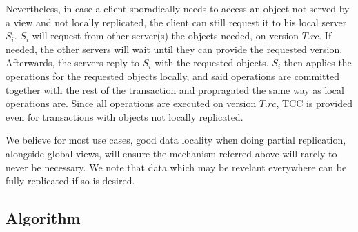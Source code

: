 \documentclass{vldb}
\begin{document}
Nevertheless, in case a client sporadically needs to access an object not served by a view and not locally replicated, the client can still request it to his local server $S_i$.
$S_i$ will request from other server(s) the objects needed, on version $T.rc$.
If needed, the other servers will wait until they can provide the requested version.
Afterwards, the servers reply to $S_i$ with the requested objects.
$S_i$ then applies the operations for the requested objects locally, and said operations are committed together with the rest of the transaction and propragated the same way as local operations are.
Since all operations are executed on version $T.rc$, TCC is provided even for transactions with objects not locally replicated.

We believe for most use cases, good data locality when doing partial replication, alongside global views, will ensure the mechanism referred above will rarely to never be necessary.
We note that data which may be revelant everywhere can be fully replicated if so is desired.

\subsection{Algorithm}
 
\end{document}
